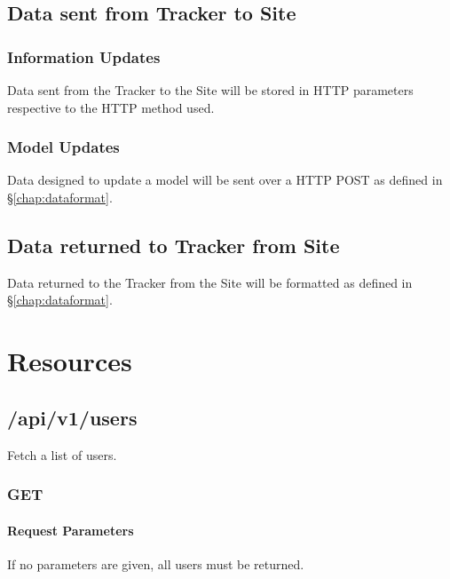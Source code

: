 \documentclass[10pt,letterpaper,titlepage]{report}
\begin{document}
\subsection{Data sent from Tracker to Site}

\subsubsection{Information Updates}

Data sent from the Tracker to the Site will be stored in HTTP parameters respective to the HTTP method used.

\subsubsection{Model Updates}

Data designed to update a model will be sent over a HTTP POST as defined in \S\ref{chap:dataformat}.

\subsection{Data returned to Tracker from Site}

Data returned to the Tracker from the Site will be formatted as defined in \S\ref{chap:dataformat}.

\section{Resources}

\subsection{/api/v1/users}

Fetch a list of users.

\subsubsection{GET}

\paragraph{Request Parameters}

If no parameters are given, all users must be returned. \\
\end{document}
